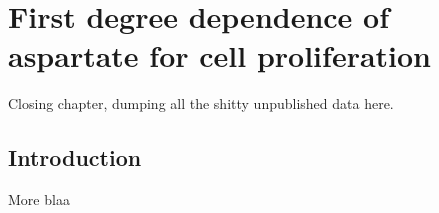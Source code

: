\chapter{First degree dependence of aspartate for cell proliferation}

Closing chapter, dumping all the shitty unpublished data here.

\section{Introduction}
More blaa